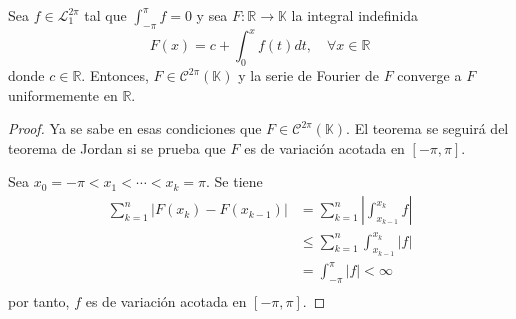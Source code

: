 \documentclass[12pt]{report}
\newcounter{it}
\theoremstyle{largebreak}
\renewcommand{\leq}{\ensuremath{\leqslant}}
\newcommand\abs[1]{\ensuremath{\left|#1\right|}}
\newcommand\cf[3]{\ensuremath{#1:#2\rightarrow#3}}
\begin{document}
    \begin{cor}
        Sea $f\in\mathcal{L}_1^{2\pi}$ tal que $\int_{-\pi}^\pi f=0$ y sea $\cf{F}{\mathbb{R}}{\mathbb{K}}$ la integral indefinida
        \begin{equation*}
            F(x)=c+\int_0^x f(t)dt,\quad\forall x\in\mathbb{R}
        \end{equation*}
        donde $c\in\mathbb{R}$. Entonces, $F\in\mathcal{C}^{2\pi}(\mathbb{K})$ y la serie de Fourier de $F$ converge a $F$ uniformemente en $\mathbb{R}$. 
    \end{cor}

    \begin{proof}
        Ya se sabe en esas condiciones que $F\in\mathcal{C}^{2\pi}(\mathbb{K})$. El teorema se seguirá del teorema de Jordan si se prueba que $F$ es de variación acotada en $[-\pi,\pi]$.

        Sea $x_0=-\pi<x_1<\cdots<x_k=\pi$. Se tiene
        \begin{equation*}
            \begin{split}
                \sum_{ k=1}^n\abs{F(x_k)-F(x_{ k-1})}&=\sum_{ k=1}^n\abs{\int_{ x_{ k-1}}^{x_k}f}\\
                &\leq\sum_{ k=1}^n\int_{ x_{ k-1}}^{x_k}\abs{f}\\
                &=\int_{-\pi}^\pi\abs{f}<\infty \\
            \end{split}
        \end{equation*}
        por tanto, $f$ es de variación acotada en $[-\pi,\pi]$.
    \end{proof}
\end{document}
